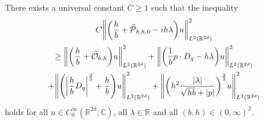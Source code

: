 \documentclass[10pt]{amsart}
\theoremstyle{definition}\newtheorem{defi}[theo]{Definition}\newtheorem{rema}[theo]{Remark}\newtheorem{exam}[theo]{Example}\newtheorem{exem}[theo]{Example}\newtheorem{nota}[theo]{Notation}
\newcommand{\C}{\mathbb{C}}
\newcommand{\R}{\mathbb{R}}
\newcommand{\clO}{\mathcal{O}}
\newcommand{\clP}{\mathcal{P}}
\let\oldhat\hat
\renewcommand*{\hat}[1]{\mathchoice{\widehat{#1}}{\widehat{#1}}{\oldhat{#1}}{\oldhat{#1}}}
\let\originalleft\left
\let\originalright\right
\renewcommand{\left}{\mathopen{}\mathclose\bgroup\originalleft}
\renewcommand{\right}{\aftergroup\egroup\originalright}
\begin{document}
\begin{prop}\label{pr:SubellipticEstimateEuclidianCase}
There exists a universal constant $C\geq 1$ such that the inequality
\begin{multline}\label{eq:LowerBoundWithParameterbh}
C\left\| \left(\frac{h}{b}+ \hat{\clP}_{b,h,0} -ih\lambda\right)u \right\|^{2}_{L^2(\R^{2d})}\\
\geq \left\| \left(\frac{h}{b}+\hat{\clO}_{b,h}\right)u\right\|^{2}_{L^2(\R^{2d})} + \left\|\left(\frac{1}{b}p\cdot D_q -h\lambda\right)u\right\|^{2}_{L^2(\R^{2d})} \\
+ \left\|\left(\left|\frac{h}{b}D_{q}\right|^{\frac{2}{3}}+\frac{h}{b}\right)u\right\|^{2}_{L^2(\R^{2d})} +
\left\|
\left(h^{2}\frac{|\lambda|}{\sqrt{hb}+|p|}
\right)^{\frac{2}{3}} u
\right\|^{2}_{L^2(\R^{2d})}
\end{multline}
holds for all $u \in C^\infty_0(\R^{2d};\C)$, all $\lambda \in \R$ and all $(b,h) \in (0,\infty)^2$.
\end{prop}
\end{document}
